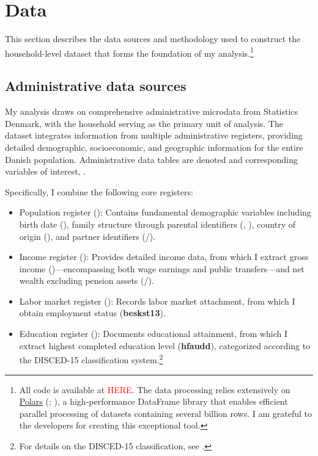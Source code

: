 \documentclass[main.tex]{subfiles}
\begin{document}
\section{Data}
\label{sec:data}

This section describes the data sources and methodology used to construct the household-level dataset that forms the foundation of my analysis.\footnote{All code is available at \textcolor{red}{HERE}. The data processing relies extensively on \href{https://github.com/pola-rs/polars}{Polars} (\textcite{polars_ritchie_vink_2025}; \textcite{polars_grouper_van_eechoud}), a high-performance DataFrame library that enables efficient parallel processing of datasets containing several billion rows. I am grateful to the developers for creating this exceptional tool.} 

\subsection{Administrative data sources}

My analysis draws on comprehensive administrative microdata from Statistics Denmark, with the household serving as the primary unit of analysis. The dataset integrates information from multiple administrative registers, providing detailed demographic, socioeconomic, and geographic information for the entire Danish population. Administrative data tables are denoted  and corresponding variables of interest, .

Specifically, I combine the following core registers:

\begin{itemize}
    \item Population register (): Contains fundamental demographic variables including birth date (), family structure through parental identifiers (, ), country of origin (), and partner identifiers (/).
    
    \item Income register (): Provides detailed income data, from which I extract gross income ()—encompassing both wage earnings and public transfers—and net wealth excluding pension assets (/).
    
    \item Labor market register (): Records labor market attachment, from which I obtain employment status (\textbf{beskst13}).
    
    \item Education register (): Documents educational attainment, from which I extract highest completed education level (\textbf{hfaudd}), categorized according to the DISCED-15 classification system.\footnote{For details on the DISCED-15 classification, see \textcite{dst_disced_edu}.}
\end{itemize}
\end{document}
